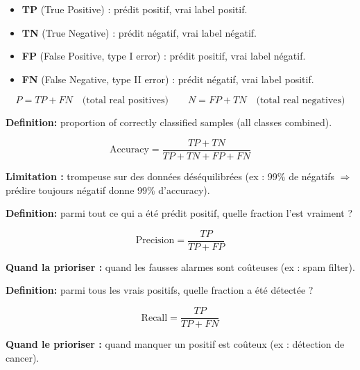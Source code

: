 \documentclass[11pt,a4paper,openany]{book}
\begin{document}
\vspace{0.4cm}

\begin{itemize}
    \item \textbf{TP} (True Positive) : prédit positif, vrai label positif.
    \item \textbf{TN} (True Negative) : prédit négatif, vrai label négatif.
    \item \textbf{FP} (False Positive, type I error) : prédit positif, vrai label négatif.
    \item \textbf{FN} (False Negative, type II error) : prédit négatif, vrai label positif.
\end{itemize}

\vspace{0.4cm}

\[
P = TP + FN \quad \text{(total real positives)}
\qquad
N = FP + TN \quad \text{(total real negatives)}
\]

\vspace{0.8cm}

\begin{defnbox}[title=Accuracy]
\textbf{Definition:} proportion of correctly classified samples (all classes combined).

\[
\mathrm{Accuracy} = \frac{TP + TN}{TP + TN + FP + FN}
\]

\textbf{Limitation :} trompeuse sur des données déséquilibrées (ex : 99\% de négatifs $\Rightarrow$ prédire toujours négatif donne 99\% d'accuracy).
\end{defnbox}

\vspace{0.4cm}

\begin{defnbox}[title=Precision]
\textbf{Definition:} parmi tout ce qui a été prédit positif, quelle fraction l'est vraiment ?

\[
\mathrm{Precision} = \frac{TP}{TP + FP}
\]

\textbf{Quand la prioriser :} quand les fausses alarmes sont coûteuses (ex : spam filter).
\end{defnbox}

\vspace{0.4cm}

\begin{defnbox}[title=Recall (Sensitivity)]
\textbf{Definition:} parmi tous les vrais positifs, quelle fraction a été détectée ?

\[
\mathrm{Recall} = \frac{TP}{TP + FN}
\]

\textbf{Quand le prioriser :} quand manquer un positif est coûteux (ex : détection de cancer).
\end{defnbox}
\end{document}
